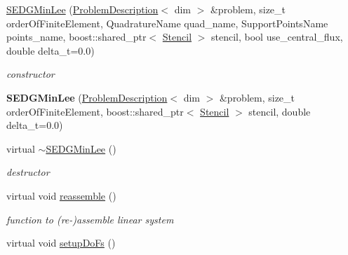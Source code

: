 \begin{DoxyCompactItemize}
\item 
\hyperlink{classnatrium_1_1SEDGMinLee_a774e2c04bcb9ef8f8c900b4ffaf140ec}{SEDGMinLee} (\hyperlink{classnatrium_1_1ProblemDescription}{ProblemDescription}$<$ dim $>$ \&problem, size\_\-t orderOfFiniteElement, QuadratureName quad\_\-name, SupportPointsName points\_\-name, boost::shared\_\-ptr$<$ \hyperlink{classnatrium_1_1Stencil}{Stencil} $>$ stencil, bool use\_\-central\_\-flux, double delta\_\-t=0.0)
\begin{DoxyCompactList}\small\item\em constructor \item\end{DoxyCompactList}\item 
\hypertarget{classnatrium_1_1SEDGMinLee_a1393ad1c5649dab747cd78b1e88ccd0f}{
{\bfseries SEDGMinLee} (\hyperlink{classnatrium_1_1ProblemDescription}{ProblemDescription}$<$ dim $>$ \&problem, size\_\-t orderOfFiniteElement, boost::shared\_\-ptr$<$ \hyperlink{classnatrium_1_1Stencil}{Stencil} $>$ stencil, double delta\_\-t=0.0)}
\label{classnatrium_1_1SEDGMinLee_a1393ad1c5649dab747cd78b1e88ccd0f}

\item 
\hypertarget{classnatrium_1_1SEDGMinLee_a6c55a31bc4cb0e314876af7251ad8ce3}{
virtual \hyperlink{classnatrium_1_1SEDGMinLee_a6c55a31bc4cb0e314876af7251ad8ce3}{$\sim$SEDGMinLee} ()}
\label{classnatrium_1_1SEDGMinLee_a6c55a31bc4cb0e314876af7251ad8ce3}

\begin{DoxyCompactList}\small\item\em destructor \item\end{DoxyCompactList}\item 
\hypertarget{classnatrium_1_1SEDGMinLee_afc9430efe8aefc7bbe580db2302b2392}{
virtual void \hyperlink{classnatrium_1_1SEDGMinLee_afc9430efe8aefc7bbe580db2302b2392}{reassemble} ()}
\label{classnatrium_1_1SEDGMinLee_afc9430efe8aefc7bbe580db2302b2392}

\begin{DoxyCompactList}\small\item\em function to (re-\/)assemble linear system \item\end{DoxyCompactList}\item 
\hypertarget{classnatrium_1_1SEDGMinLee_a61d0a648a6a46a4fb7445c67e010f14e}{
virtual void \hyperlink{classnatrium_1_1SEDGMinLee_a61d0a648a6a46a4fb7445c67e010f14e}{setupDoFs} ()}
\label{classnatrium_1_1SEDGMinLee_a61d0a648a6a46a4fb7445c67e010f14e}


\end{DoxyCompactItemize}
